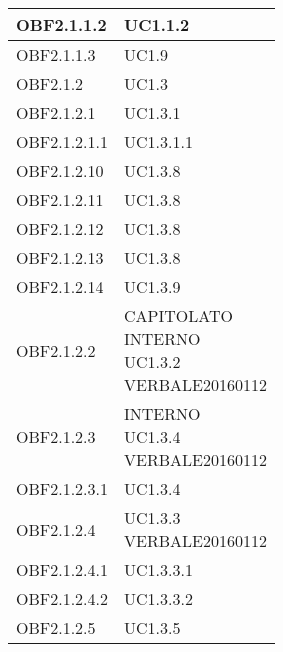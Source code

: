 \documentclass{scalatekids-article}
\begin{document}
\begin{longtable}[H]{|p{5.5cm}|p{5.5cm}|}
  \hline
  OBF2.1.1.2 & \multiLineCell[t]{UC1.1.2\\}\\
  \hline
  OBF2.1.1.3 & \multiLineCell[t]{UC1.9\\}\\
  \hline
  OBF2.1.2 & \multiLineCell[t]{UC1.3\\}\\
  \hline
  OBF2.1.2.1 & \multiLineCell[t]{UC1.3.1\\}\\
  \hline
  OBF2.1.2.1.1 & \multiLineCell[t]{UC1.3.1.1\\}\\
  \hline
  OBF2.1.2.10 & \multiLineCell[t]{UC1.3.8\\}\\
  \hline
  OBF2.1.2.11 & \multiLineCell[t]{UC1.3.8\\}\\
  \hline
  OBF2.1.2.12 & \multiLineCell[t]{UC1.3.8\\}\\
  \hline
  OBF2.1.2.13 & \multiLineCell[t]{UC1.3.8\\}\\
  \hline
  OBF2.1.2.14 & \multiLineCell[t]{UC1.3.9\\}\\
  \hline
  OBF2.1.2.2 & \multiLineCell[t]{CAPITOLATO\\INTERNO\\UC1.3.2\\VERBALE20160112\\}\\
  \hline
  OBF2.1.2.3 & \multiLineCell[t]{INTERNO\\UC1.3.4\\VERBALE20160112\\}\\
  \hline
  OBF2.1.2.3.1 & \multiLineCell[t]{UC1.3.4\\}\\
  \hline
  OBF2.1.2.4 & \multiLineCell[t]{UC1.3.3\\VERBALE20160112\\}\\
  \hline
  OBF2.1.2.4.1 & \multiLineCell[t]{UC1.3.3.1\\}\\
  \hline
  OBF2.1.2.4.2 & \multiLineCell[t]{UC1.3.3.2\\}\\
  \hline
  OBF2.1.2.5 & \multiLineCell[t]{UC1.3.5\\}\\

\end{longtable}
\end{document}
